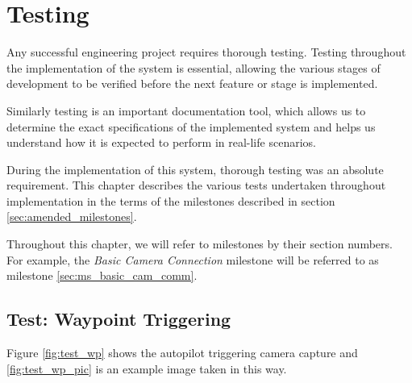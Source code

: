 
\chapter{Testing}
Any successful engineering project requires thorough testing. Testing throughout
the implementation of the system is essential, allowing the various stages of 
development to be verified before the next feature or stage is implemented.

Similarly testing is an important documentation tool, which allows us to determine the
exact specifications of the implemented system and helps us understand how it is 
expected to perform in real-life scenarios.

During the implementation of this system, thorough testing was an absolute
requirement. This chapter describes the various tests undertaken
throughout implementation in the terms of the milestones described in section
\ref{sec:amended_milestones}. 

Throughout this chapter, we will refer to milestones by their section numbers.
For example, the \emph{Basic Camera Connection} milestone will be referred
to as milestone \ref{sec:ms_basic_cam_comm}.









\section{Test: Waypoint Triggering}
\label{sec:test_wp_trig}
Figure \ref{fig:test_wp} shows the autopilot triggering camera capture and \ref{fig:test_wp_pic} is an example image taken in this way.

